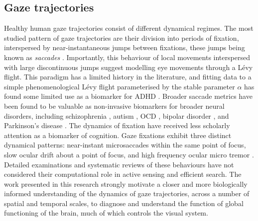 \subsection{Gaze trajectories}\label{subsec:gaze_traj}
Healthy human gaze trajectories consist of different dynamical regimes. The most studied pattern of gaze trajectories are their division into periods of fixation, interspersed by near-instantaneous jumps between fixations, these jumps being known as \textit{saccades} \cite{erkelens_coordination_2006, seung_how_1996, lencastre_dynamical_2025, benitezy_eyetracking_1970}. Importantly, this behaviour of local movements interspersed with large discontinuous jumps suggest modelling eye movements through a Lévy flight. This paradigm has a limited history in the literature, and fitting data to a simple phenomenological Lévy flight parameterised by the stable parameter $\alpha$ has found some limited use as a biomarker for ADHD \cite{papanikolaou_levy_2024}. Broader saccade metrics have been found to be valuable as non-invasive biomarkers for broader neural disorders, including schizophrenia \cite{caldani_saccadic_2017, morita_eye_2017, zhu_diagnosis_2024, lindner_disorders_2005, zhu_diagnosis_2024}, autism \cite{bittencourt_saccadic_2013, wang_saccadic_2025}, OCD \cite{bittencourt_saccadic_2013}, bipolar disorder \cite{wang_saccadic_2025, bittencourt_saccadic_2013}, and Parkinson's disease \cite{wang_saccadic_2025, bittencourt_saccadic_2013}. The dynamics of fixation have received less scholarly attention as a biomarker of cognition. Gaze fixations exhibit three distinct dynamical patterns: near-instant microsaccades within the same point of focus, slow ocular drift about a point of focus, and high frequency ocular micro tremor \cite{van_ede_looking_2026,graham_ocular_2023, engbert_integrated_2011, spauschus_origin_1999}. Detailed examinations and systematic reviews of these behaviours have not considered their computational role in active sensing and efficient search. The work presented in this research strongly motivate a closer and more biologically informed understanding of the dynamics of gaze trajectories, across a number of spatial and temporal scales, to diagnose and understand the function of global functioning of the brain, much of which controls the visual system.